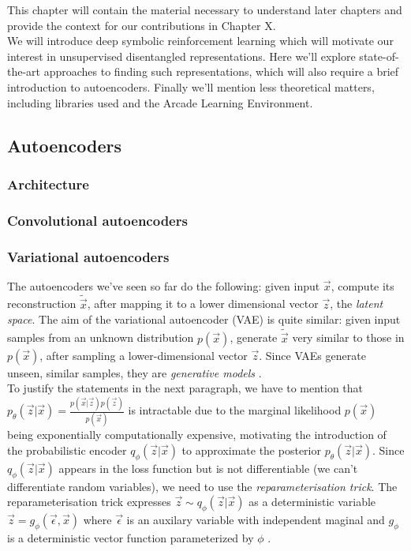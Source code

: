 \documentclass[12pt,twoside]{article}
\begin{document}
This chapter will contain the material necessary to understand later chapters and provide the context for our contributions in Chapter X.\\

We will introduce deep symbolic reinforcement learning which will motivate our interest in unsupervised disentangled representations. Here we'll explore state-of-the-art approaches to finding such representations, which will also require a brief introduction to autoencoders. Finally we'll mention less theoretical matters, including libraries used and the Arcade Learning Environment.

\subsection{Autoencoders}

\subsubsection{Architecture}

\subsubsection{Convolutional autoencoders}

\subsubsection{Variational autoencoders}

The autoencoders we've seen so far do the following: given input $\vec{x}$, compute its reconstruction $\widetilde{\vec{x}}$, after mapping it to a lower dimensional vector $\vec{z}$, the \textit{latent space}. The aim of the variational autoencoder (VAE) is quite similar: given input samples from an unknown distribution $p(\vec{x})$, generate $\widetilde{\vec{x}}$ very similar to those in $p(\vec{x})$, after sampling a lower-dimensional vector $\vec{z}$. Since VAEs generate unseen, similar samples, they are \textit{generative models} \cite{Doersch2016}.\\

To justify the statements in the next paragraph, we have to mention that $p_{\theta}(\vec{z}|\vec{x})=\frac{p(\vec{x}|\vec{z})p(\vec{z})}{p(\vec{x})}$ is intractable due to the marginal likelihood $p(\vec{x})$ being exponentially computationally expensive, motivating the introduction of the probabilistic encoder $q_{\phi}(\vec{z}|\vec{x})$ to approximate the posterior $p_{\theta}(\vec{z}|\vec{x})$. Since $q_{\phi}(\vec{z}|\vec{x})$ appears in the loss function but is not differentiable (we can't differentiate random variables), we need to use the \textit{reparameterisation trick}. The reparameterisation trick expresses $\vec{z}\sim q_{\phi}(\vec{z}|\vec{x})$ as a deterministic variable $\vec{z}=g_{\phi}(\vec{\epsilon},\vec{x})$ where $\vec{\epsilon}$ is an auxilary variable with independent maginal and $g_{\phi}$ is a deterministic vector function parameterized by $\phi$ \cite{Kingma2014}.\\
\end{document}
